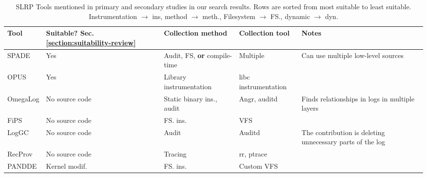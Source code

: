 \begin{table}
\caption{SLRP Tools mentioned in primary and secondary studies in our search results. Rows are sorted from most suitable to least suitable. Instrumentation \(\to\) ins, method \(\to\) meth., Filesystem \(\to\) FS., dynamic \(\to\) dyn.}
\label{table:tools}
{
\scriptsize
\begin{tabular}{p{}p{}p{}p{}p{}}
Tool                                                    & Suitable? Sec. \ref{section:suitability-review}
                                                                           & Collection method                       & Collection tool                               & Notes                                                         \\
\midrule
SPADE \cite{gehani_spade_2012}                          & Yes              & Audit, FS, \textbf{or} compile-time     & Multiple\footnotemark{}                       & Can use multiple low-level sources                            \\
OPUS \cite{balakrishnan_opus_2013}                      & Yes              & Library instrumentation                 & libc instrumentation                          &                                                               \\
OmegaLog \cite{hassan_omegalog_2020}                    & No source code   & Static binary ins., audit               & Angr, auditd                                  & Finds relationships in logs in multiple layers                \\
FiPS \cite{sultana_file_2013}                           & No source code   & FS. ins.                                & VFS                                           &                                                               \\
LogGC                                                   & No source code   & Audit                                   & Auditd                                        & The contribution is deleting unnecessary parts of the log     \\
RecProv \cite{ji_recprov_2016}                          & No source code   & Tracing                                 & rr, ptrace                                    &                                                               \\
PANDDE \cite{fadolalkarim_pandde_2016}                  & Kernel modif.    & FS. ins.                                & Custom VFS                                    &                                                               \\

\end{tabular}}
\end{table}
